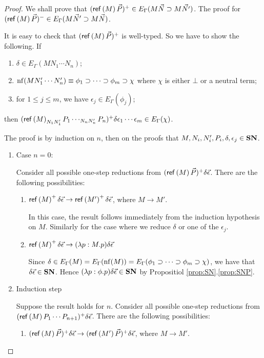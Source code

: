 \begin{proof}
We shall prove that $(\mathsf{ref} \left( {M} \right) \vec{P})^+ \in E_\Gamma(M \vec{N} \supset M \vec{N'})$.  The proof for
$(\mathsf{ref} \left( {M} \right) \vec{P})^- \in E_\Gamma(M \vec{N}' \supset M \vec{N})$.

It is easy to check that $(\mathsf{ref} \left( {M} \right) \vec{P})^+$ is well-typed.  So we have to show the following.  If
\begin{enumerate}
\item
$\delta \in E_\Gamma(M N_1 \cdots N_n)$;
\item
$\mathrm{nf} ( {M N_1' \cdots N_n'} ) \equiv \phi_1 \supset \cdots \supset \phi_m \supset \chi$ where $\chi$
is either $\bot$ or a neutral term;
\item
for $1 \leq j \leq m$, we have $\epsilon_j \in E_\Gamma(\phi_j)$;
\end{enumerate}
then $(\mathsf{ref} \left( {M} \right)_{N_1 N_1'} P_1 \cdots_{N_n N_n'} P_n)^+ \delta \epsilon_1 \cdots \epsilon_m \in E_\Gamma(\chi)$.

The proof is by induction on $n$, then on the proofs that $M, N_i, N_i', P_i, \delta, \epsilon_j \in \mathbf{SN}$.

\begin{enumerate}
\item
\label{Case 1}
Case $n = 0$:

Consider all possible one-step
reductions from $(\mathsf{ref} \left( {M} \right) \vec{P})^+ \delta \vec{\epsilon}$.  There are the following possibilities:
\begin{enumerate}
\item
\label{Case 1.1}
$\mathsf{ref} \left( {M} \right)^+ \delta \vec{\epsilon} \rightarrow \mathsf{ref} \left( {M'} \right)^+ \delta \vec{\epsilon}$, where
$M \rightarrow M'$.

In this case, the result follows immediately from the induction hypothesis on $M$.  Similarly for the case where we reduce
$\delta$ or one of the $\epsilon_j$.
\item
\label{Case 1.2}
$\mathsf{ref} \left( {M} \right)^+ \delta \vec{\epsilon} \rightarrow (\lambda p:M.p)\delta \vec{\epsilon}$

Since $\delta \in E_\Gamma(M) = E_\Gamma(\mathrm{nf} ( {M} )) = E_\Gamma(\phi_1 \supset \cdots \supset \phi_m \supset \chi)$, we have that
$\delta \vec{\epsilon} \in \mathbf{SN}$.  Hence $(\lambda p:\phi.p) \delta \vec{\epsilon} \in \mathbf{SN}$ by Propositiol \ref{prop:SN}.\ref{prop:SNP}.
\end{enumerate}
\item
Induction step

Suppose the result holds for $n$.  Consider all possible one-step reductions from $(\mathsf{ref} \left( {M} \right) P_1 \cdots P_{n+1})^+ \delta \vec{\epsilon}$.
There are the following possibilities:
\begin{enumerate}
\item
$(\mathsf{ref} \left( {M} \right) \vec{P})^+ \delta \vec{\epsilon} \rightarrow (\mathsf{ref} \left( {M'} \right) \vec{P})^+ \delta \vec{\epsilon}$, where
$M \rightarrow M'$.


\end{enumerate}
\end{enumerate}
\end{proof}
